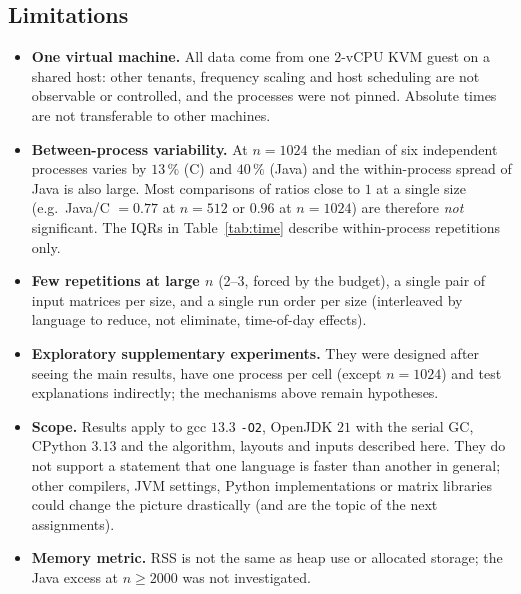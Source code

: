 \subsection{Limitations}
\begin{itemize}
  \item \textbf{One virtual machine.} All data come from one $2$-vCPU KVM guest on a shared host: other tenants, frequency scaling and
        host scheduling are not observable or controlled, and the processes were not pinned. Absolute times are not transferable to other machines.
  \item \textbf{Between-process variability.} At $n=1024$ the median of six independent processes varies by $13\,\%$ (C) and $40\,\%$ (Java)
        and the within-process spread of Java is also large. Most comparisons of ratios close to $1$ at a single size (e.g.\ Java/C
        $=0.77$ at $n=512$ or $0.96$ at $n=1024$) are therefore \emph{not} significant. The IQRs in Table~\ref{tab:time} describe
        within-process repetitions only.
  \item \textbf{Few repetitions at large $n$} (2--3, forced by the budget), a single pair of input matrices per size, and a single run
        order per size (interleaved by language to reduce, not eliminate, time-of-day effects).
  \item \textbf{Exploratory supplementary experiments.} They were designed after seeing the main results, have one process per cell (except $n=1024$) and
        test explanations indirectly; the mechanisms above remain hypotheses.
  \item \textbf{Scope.} Results apply to gcc $13.3$ \texttt{-O2}, OpenJDK $21$ with the serial GC, CPython $3.13$ and the algorithm, layouts and
        inputs described here. They do not support a statement that one language is faster than another in general; other compilers, JVM settings, Python
        implementations or matrix libraries could change the picture drastically (and are the topic of the next assignments).
  \item \textbf{Memory metric.} RSS is not the same as heap use or allocated storage; the Java excess at $n\ge2000$ was not investigated.
\end{itemize}

